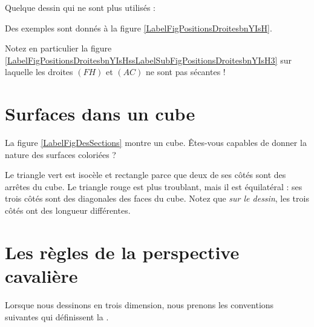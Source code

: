Quelque dessin qui ne sont plus utilisés :


Des exemples sont donnés à la figure \ref{LabelFigPositionsDroitesbnYIsH}. %
\newcommand{\CaptionFigPositionsDroitesbnYIsH}{Droites coplanaires ou non.}


Notez en particulier la figure \ref{LabelFigPositionsDroitesbnYIsHssLabelSubFigPositionsDroitesbnYIsH3} sur laquelle les droites \( (FH)\) et \( (AC)\) ne sont pas sécantes !


\section{Surfaces dans un cube}

La figure \ref{LabelFigDesSections} montre un cube. Êtes-vous capables de donner la nature des surfaces coloriées ?
\newcommand{\CaptionFigDesSections}{Exercice de vision dans l'espace.}

Le triangle vert est isocèle et rectangle parce que deux de ses côtés sont des arrêtes du cube. Le triangle rouge est plus troublant, mais il est équilatéral : ses trois côtés sont des diagonales des faces du cube. Notez que \emph{sur le dessin}, les trois côtés ont des longueur différentes.

\section{Les règles de la perspective cavalière}

Lorsque nous dessinons en trois dimension, nous prenons les conventions suivantes qui définissent la .

